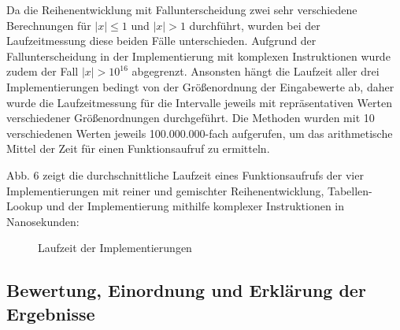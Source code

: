 \documentclass[course=erap] {aspdoc}
\begin{document}
    Da die Reihenentwicklung mit Fallunterscheidung zwei sehr verschiedene Berechnungen für $|x|\leq1$ und $|x|> 1$ durchführt, wurden bei der Laufzeitmessung diese beiden Fälle unterschieden. Aufgrund der Fallunterscheidung in der Implementierung mit komplexen Instruktionen wurde zudem der Fall $|x|>10^{16}$ abgegrenzt.
    Ansonsten hängt die Laufzeit aller drei Implementierungen bedingt von der Größenordnung der Eingabewerte ab, daher wurde die Laufzeitmessung für die Intervalle jeweils mit repräsentativen Werten verschiedener Größenordnungen durchgeführt.
    Die Methoden wurden mit 10 verschiedenen Werten jeweils 100.000.000-fach aufgerufen, um das arithmetische Mittel der Zeit für einen Funktionsaufruf zu ermitteln.

    Abb. 6 zeigt die durchschnittliche Laufzeit eines Funktionsaufrufs der vier Implementierungen mit reiner und gemischter Reihenentwicklung, Tabellen-Lookup und der Implementierung mithilfe komplexer Instruktionen in Nanosekunden:

    \begin{figure}[h]
        \caption{Laufzeit der Implementierungen}
    \end{figure}

    \subsection{Bewertung, Einordnung und Erklärung der Ergebnisse}\label{subsec:bewertung-einordnung-und-erklarung-der-ergebnisse}
\end{document}
